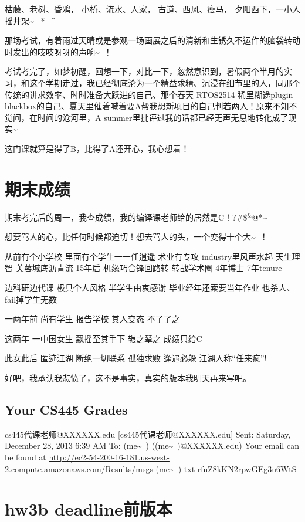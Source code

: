 \documentclass[12pt]{book}
\begin{document}
枯藤、老树、昏鸦，
小桥、流水、人家，
古道、西风、瘦马，
夕阳西下，一小人摇井架\textasciitilde{}~ *\_\^{}

那场考试，有着雨过天晴或是参观一场画展之后的清新和生锈久不运作的脑袋转动时发出的吱吱呀呀的声响\textasciitilde{}~！

考试考完了，如梦初醒，回想一下，对比一下，忽然意识到，暑假两个半月的实习，和这个学期走过，我已经彻底沦为一个精益求精、沉浸在细节里的人，同那个传统的讲求效率、时时准备大跃进的自己、那个春天 RTOS2514 稀里糊途plugin blackbox的自己、夏天里催着喊着要A帮我想新项目的自己判若两人！原来不知不觉间，在时间的沧河里，A summer里批评过我的话都已经无声无息地转化成了现实\textasciitilde{}~

这门课就算是得了B，比得了A还开心，我心想着！

\chapter{期末成绩}
\label{sec-7}

期末考完后的周一，我查成绩，我的编译课老师给的居然是C！?\#\$$^{\text{\&}}$@*\textasciitilde{} 

想要骂人的心，比任何时候都迫切！想去骂人的头，一个变得十个大\textasciitilde{}~！

从前有个小学校
里面有个学生一一任逍遥
术业有专攻
industry里风声水起
天生理智
芙蓉城底沥青流
15年后
机缘巧合锋回路转
转战学术圈
4年博士
7年tenure

边科研边代课
极具个人风格
半学生由衷感谢
毕业经年还索要当年作业
也杀人、fail掉学生无数

一两年前
尚有学生
报告学校
其人变态
不了了之

这两年
一中国女生
飘摇至其手下
辗之辇之
成绩只给C

此女此后
匿迹江湖
断绝一切联系
孤独求败
逢遇必躲
江湖人称“任来疯”!

好吧，我承认我悲愤了，这不是事实，真实的版本我明天再来写吧。 

\section{Your CS445 Grades}
\label{sec-7-1}
cs445代课老师@XXXXXX.edu [cs445代课老师@XXXXXX.edu]
Sent:        Saturday, December 28, 2013 6:39 AM
To:        
 (me\textasciitilde{}~) ((me\textasciitilde{}~)@XXXXXX.edu)
Your email can be found at \url{http://ec2-54-200-16-181.us-west-2.compute.amazonaws.com/Results/msgs}-(me\textasciitilde{}~)-txt-rfnZ8kKN2rpwGEg3u6WtS

\chapter{hw3b deadline前版本}
\label{sec-8}
\end{document}
